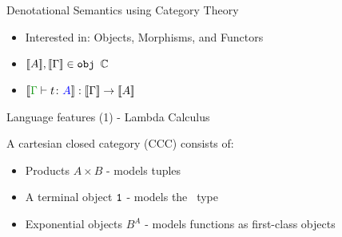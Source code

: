 \documentclass{beamer}
\newcommand\script[1]{}
\begin{document}
\begin{frame}{Denotational Semantics using Category Theory}
    \begin{itemize}
        \item Interested in: Objects, Morphisms, and Functors
        \item ${\bf [\![}A{\bf ]\!]}, {\bf [\![}\Gamma{\bf ]\!]} \in\texttt{obj }\mathbb{C}$
        \item $\deno{\gtyperelation{t}{A}}: \deno{\G}\rightarrow \deno{A}$
    \end{itemize}


    \script{
        - In part II, we used domains to handle the semantics of non-termination. Lurking beneath this notion is the idea that we can use category theoretic structure to construct our denotations.

        - Here we map types and type environments to objects in a particular category, and correctly typed terms to morphisms (arrows) in the category.

        - One more structure we need is a functor - a map of objects to objects and morphisms to morphisms that preserves composition of terms.
    }
\end{frame}

\begin{frame}{Language features (1) - Lambda Calculus}

        A cartesian closed category (CCC) consists of:
        \begin{itemize}
            \item Products $A\times B$ - models tuples
            \item A terminal object $\texttt{1}$ - models the \U\texttt{  }type
            \item Exponential objects $B^A$ - models functions as first-class objects
        \end{itemize}

        \script{
            Now let's look at what category theoretic structure you need to model different language features.
            
            - For lambda calculus style languages, you need at least a cartesian closed category.

            - In terms of the category of sets, this gives you sets of pairs of objects, sets of functions, and the single element set.

            - These are used to model pairs, lambda terms, giving us higher order functions, and the terminal, single element set allows us to interpret the unit type and ground terms.
        }
\end{frame}
\end{document}
